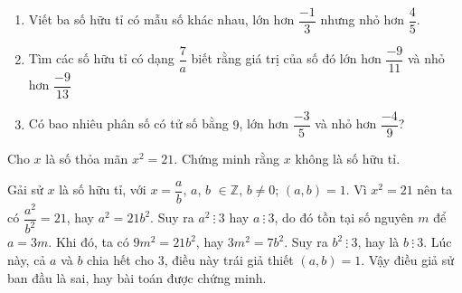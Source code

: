 \begin{bt}
	\begin{enumerate}
		\item Viết ba số hữu tỉ có mẫu số khác nhau, lớn hơn $\dfrac{-1}{3}$ nhưng nhỏ hơn $\dfrac{4}{5}$.
		\item Tìm các số hữu tỉ có dạng $\dfrac{7}{a}$ biết rằng giá trị của số đó lớn hơn $\dfrac{-9}{11}$ và nhỏ hơn $\dfrac{-9}{13}$
		\item Có bao nhiêu phân số có tử số bằng $9$, lớn hơn $\dfrac{-3}{5}$ và nhỏ hơn $\dfrac{-4}{9}$?
		
	\end{enumerate}
\end{bt}

\begin{bt}
Cho $x$ là số thỏa mãn $x^2=21$. Chứng minh rằng $x$ không là số hữu tỉ. 

\loigiai
{
Gải sử $x$ là số hữu tỉ, với $x=\dfrac{a}{b}$, $a$, $b$ $\in \mathbb{Z}$, $b \neq 0$; $(a,b)=1$. Vì $x^2=21$ nên ta có $\dfrac{a^2}{b^2}=21$, hay $a^2=21b^2$. Suy ra $a^2 \ \vdots\ 3$ hay $a\ \vdots\ 3$, do đó tồn tại số nguyên $m$ để $a=3m.$ Khi đó, ta có $9m^2=21b^2$, hay $3m^2=7b^2$. Suy ra $b^2\ \vdots \ 3$, hay là $b \ \vdots\ 3$. Lúc này, cả $a$ và $b$ chia hết cho $3$, điều này trái giả thiết $(a,b)=1$. Vậy điều giả sử ban đầu là sai, hay bài toán được chứng minh.
}
\end{bt}



